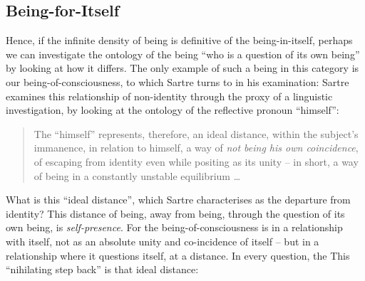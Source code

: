 \subsection*{Being-for-Itself}

Hence, if the infinite density of being is definitive of the being-in-itself, perhaps we can investigate the ontology of the being \enquote{who is a question of its own being} by looking at how it differs. The only example of such a being in this category is our being-of-consciousness, to which Sartre turns to in his examination:  
%
%
%
%
Sartre examines this relationship of non-identity through the proxy of a linguistic investigation, by looking at the ontology of the reflective pronoun \enquote{himself}:

\blockcquote[126]{Sartre}{%
    The \enquote{himself} represents, therefore, an ideal distance, within the subject's immanence, in relation to himself, a way of \emph{not being his own coincidence}, of escaping from identity even while positing as its unity -- in short, a way of being in a constantly unstable equilibrium \ldots\
}

\noindent
What is this \enquote{ideal distance}, which Sartre characterises as the departure from identity? This distance of being, away from being, through the question of its own being, is \emph{self-presence}. For the being-of-consciousness is in a relationship with itself, not as an absolute unity and co-incidence of itself -- but in a relationship where it questions itself, at a distance. In every question, the  This \enquote{nihilating step back} is that ideal distance:

